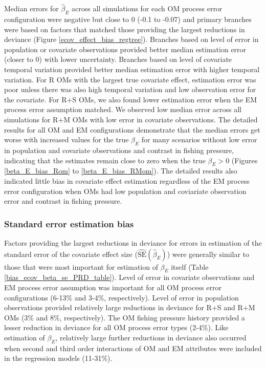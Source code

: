 \documentclass[
  12pt,
]{article}
\begin{document}
Median errors for \(\widehat \beta_E\) across all simulations for each OM process error configuration were negative but close to 0 (-0.1 to -0.07) and primary branches were based on factors that matched those providing the largest reductions in deviance (Figure \ref{ecov_effect_bias_regtree}). Branches based on level of error in population or covariate observations provided better median estimation error (closer to 0) with lower uncertainty. Branches based on level of covariate temporal variation provided better median estimation error with higher temporal variation. For R OMs with the largest true covariate effect, estimation error was poor unless there was also high temporal variation and low observation error for the covariate. For R+S OMs, we also found lower estimation error when the EM process error assumption matched. We observed low median error across all simulations for R+M OMs with low error in covariate observations. The detailed results for all OM and EM configurations demonstrate that the median errors get worse with increased values for the true \(\beta_E\) for many scenarios without low error in population and covariate observations and contrast in fishing pressure, indicating that the estimates remain close to zero when the true \(\beta_E>0\) (Figures \ref{beta_E_bias_Rom} to \ref{beta_E_bias_RMom}). The detailed results also indicated little bias in covariate effect estimation regardless of the EM process error configuration when OMs had low population and coviariate observation error and contrast in fishing pressure.

\subsubsection*{Standard error estimation bias}\label{standard-error-estimation-bias}

Factors providing the largest reductions in deviance for errors in estimation of the standard error of the covariate effect size (\(\widehat {\text{SE}}\left(\widehat\beta_E\right)\)) were generally similar to those that were most important for estimation of \(\beta_E\) itself (Table \ref{bias_ecov_beta_se_PRD_table}). Level of error in covariate observations and EM process error assumption was important for all OM process error configurations (6-13\% and 3-4\%, respectively). Level of error in population observations provided relatively large reductions in deviance for R+S and R+M OMs (3\% and 8\%, respectively). The OM fishing pressure history provided a lesser reduction in deviance for all OM process error types (2-4\%). Like estimation of \(\beta_E\), relatively large further reductions in deviance also occurred when second and third order interactions of OM and EM attributes were included in the regression models (11-31\%).
\end{document}

